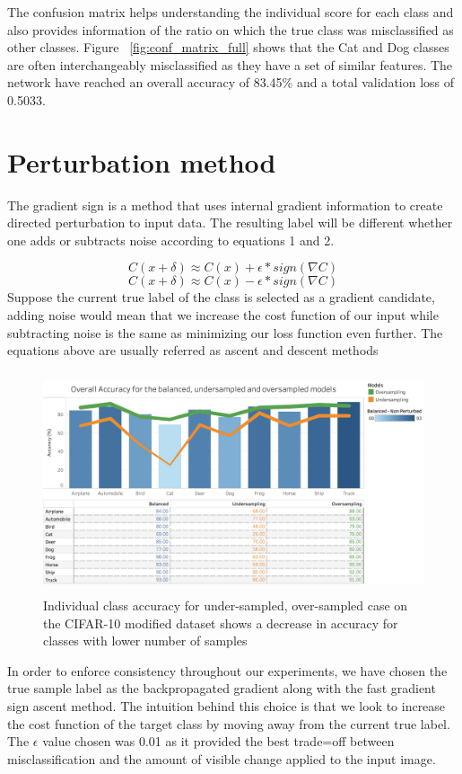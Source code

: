 The confusion matrix helps understanding the individual score for each class and also provides information of the ratio on which the true class was misclassified as other classes. Figure ~\ref{fig:conf_matrix_full} shows that the Cat and Dog classes are often interchangeably misclassified as they have a set of similar features. The network have reached an overall accuracy of 83.45\% and a total validation loss of 0.5033.

\section{Perturbation method}
The gradient sign is a method that uses internal gradient information to create directed perturbation to input data. The resulting label will be different whether one adds or subtracts noise according to equations 1 and 2. 

\begin{equation}
C(x + \delta)\approx C(x) + \epsilon * sign(\nabla C)
\end{equation}
\begin{equation}
C(x + \delta)\approx C(x) - \epsilon * sign(\nabla C)
\end{equation}
Suppose the current true label of the class is selected as a gradient candidate, adding noise would mean that we increase the cost function of our input while subtracting noise is the same as minimizing our loss function even further. The equations above are usually referred as ascent and descent methods
\begin{figure}
	\centering
	\includegraphics[height=6.5cm]{graph_non_pert.png}
	\caption{Individual class accuracy for under-sampled, over-sampled case on the CIFAR-10 modified dataset shows a decrease in accuracy for classes with lower number of samples}
	\label{fig:acc_graph}
\end{figure}
In order to enforce consistency throughout our experiments, we have chosen the true sample label as the backpropagated gradient along with the fast gradient sign ascent method. The intuition behind this choice is that we look to increase the cost function of the target class by moving away from the current true label. The $\epsilon$ value chosen was 0.01 as it provided the best trade=off between misclassification and the amount of visible change applied to the input image.

